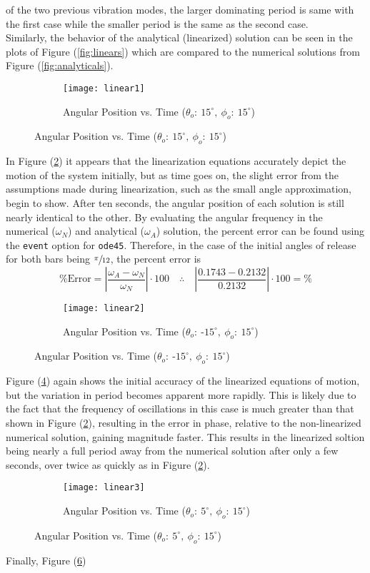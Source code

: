 \documentclass[12pt]{report}
\begin{document}
\begin{flushleft}
of the two previous vibration modes, the larger dominating period is same with the
first case while the smaller period is the same as the second case. \\
Similarly, the behavior of the analytical (linearized) solution can be seen in
the plots of Figure (\ref{fig:linears}) which are compared to the numerical solutions from
Figure (\ref{fig:analyticals}). \\
\begin{figure}[!ht]
  \caption{Numerical Solution Motion Behavior Plots}
  \label{fig:linears}
  \begin{subfigure}[t]{\textwidth}
    \texttt{[image: linear1]}
    \caption{Angular Position vs. Time ($\theta_o:~15^\circ,~\phi_o:~15^\circ$)}
    \label{fig:linear+15+15}
\end{subfigure}
\end{figure}
In Figure (\ref{fig:linear+15+15}) it appears that the linearization equations
accurately depict the motion of the system initially, but as time goes on, the slight error
from the assumptions made during linearization, such as the small angle approximation,
begin to show. After ten seconds, the angular position of each solution is still nearly
identical to the other. By evaluating the angular frequency in the numerical ($\omega_N$) and
analytical ($\omega_A$) solution, the percent error can be found using the
\lstinline[style=Matlab-editor]!event! option for \lstinline[style=Matlab-editor]!ode45!.
Therefore, in the case of the initial angles of release for both bars being
 $\sfrac{\pi}{12}$, the percent error is
$$\textrm{\% Error} = \left|\frac{\omega_A - \omega_N}{\omega_N}\right| \cdot 100
\quad\therefore\quad
\left|\frac{0.1743 - 0.2132}{0.2132}\right| \cdot 100 =
\%$$
\begin{figure}[!ht] \ContinuedFloat
\begin{subfigure}[t]{\textwidth}
    \texttt{[image: linear2]}
    \caption{Angular Position vs. Time ($\theta_o:~\textrm{-}15^\circ,~\phi_o:~15^\circ$)}
    \label{fig:linear-15+15}
  \end{subfigure}
\end{figure}
Figure (\ref{fig:linear-15+15}) again shows the initial accuracy of the linearized equations of
motion, but the variation in period becomes apparent more rapidly. This is likely due to the
fact that the frequency of oscillations in this case is much greater than that shown in
Figure (\ref{fig:linear+15+15}), resulting in the error in phase, relative to the non-linearized
numerical solution, gaining magnitude faster. This results in the linearized soltion being nearly
a full period away from the numerical solution after only a few seconds, over twice as quickly as
in Figure (\ref{fig:linear+15+15}).\\
\begin{figure}[!ht] \ContinuedFloat
  \begin{subfigure}[t]{\textwidth}
    \texttt{[image: linear3]}
    \caption{Angular Position vs. Time ($\theta_o:~5^\circ,~\phi_o:~15^\circ$)}
    \label{fig:linear+05+15}
  \end{subfigure}
\end{figure}
Finally, Figure (\ref{fig:linear+05+15})


\end{flushleft}
\end{document}
